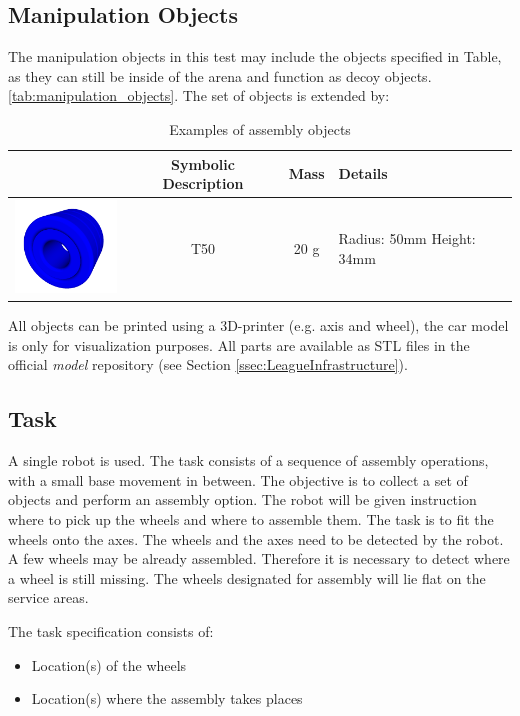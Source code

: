 \subsection{Manipulation Objects}
The manipulation objects in this test may include the objects specified in Table, as they can still be inside of the arena and function as decoy objects. \ref{tab:manipulation_objects}.
The set of objects is extended by:

\begin{table}[p]
\begin{tabular}{|c|c|c|p{5cm}|}
\hline 
 & Symbolic Description & Mass & Details \\ 
\hline 
\includegraphics[width=3cm]{./images/BAT_Tire.png}  & T50 & 20 g & Radius: 50mm \newline
 Height: 34mm \\
\hline 
\end{tabular} 

\label{tab:bat_objects}
\caption{Examples of assembly objects}
\end{table}

All objects can be printed using a 3D-printer (e.g. axis and wheel), the car model is only for visualization purposes. All parts are available as STL files in the official \RCAW \emph{model} repository (see Section \ref{ssec:LeagueInfrastructure}).


\subsection{Task}
A single robot is used. The task consists of a sequence of assembly operations, with a small base movement in between. The objective is to collect a set of objects and perform an assembly option. The robot will be given instruction where to pick up the wheels and where to assemble them. The task is to fit the wheels onto the axes. The wheels and the axes need to be detected by the robot. A few wheels may be already assembled. Therefore it is necessary to detect where a wheel is still missing. The wheels designated for assembly will lie flat on the service areas.

\par
The task specification consists of: 
\begin{itemize}
	\item Location(s) of the wheels
	\item Location(s) where the assembly takes places
\end{itemize}

